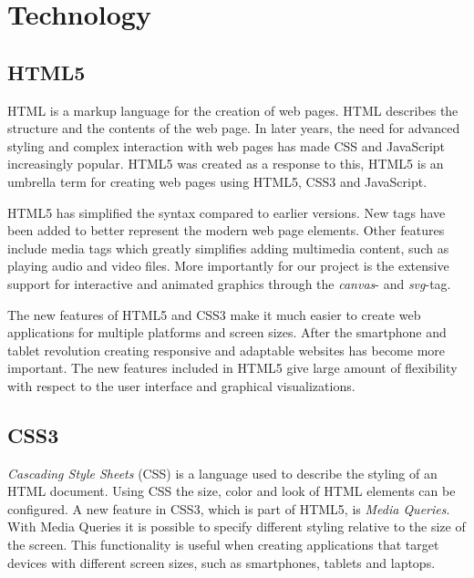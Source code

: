 \chapter{Technology} %

\label{chapter2} %


\section{HTML5}
HTML is a markup language for the creation of web pages. HTML describes the structure and the contents of the web page. In later years, the need for advanced styling and complex interaction with web pages has made CSS and JavaScript increasingly popular. HTML5 was created as a response to this, HTML5 is an umbrella term for creating web pages using HTML5, CSS3 and JavaScript.

HTML5 has simplified the syntax compared to earlier versions. New tags have been added to better represent the modern web page elements. Other features include media tags which greatly simplifies adding multimedia content, such as playing audio and video files. More importantly for our project is the extensive support for interactive and animated graphics through the \emph{canvas}- and \emph{svg}-tag.

The new features of HTML5 and CSS3 make it much easier to create web applications for multiple platforms and screen sizes. After the smartphone and tablet revolution creating responsive and adaptable websites has become more important. The new features included in HTML5 give large amount of flexibility with respect to the user interface and graphical visualizations.

\section{CSS3}
\emph{Cascading Style Sheets} (CSS) is a language used to describe the styling of an HTML document. Using CSS the size, color and look of HTML elements can be configured. A new feature in CSS3, which is part of HTML5, is \emph{Media Queries}. With Media Queries it is possible to specify different styling relative to the size of the screen. This functionality is useful when creating applications that target devices with different screen sizes, such as smartphones, tablets and laptops. 

